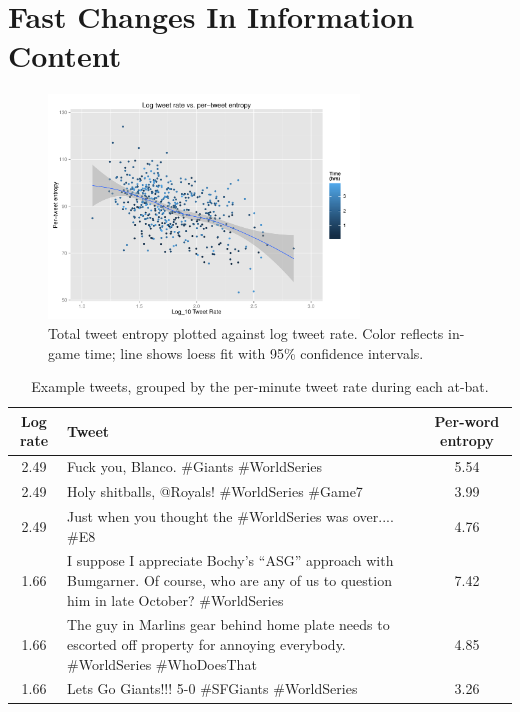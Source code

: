 \documentclass[11pt,letterpaper]{article}
\begin{document}
\section{Fast Changes In Information Content}

\begin{figure}
 \centering
  \includegraphics[width=3.25in]{figures/final-lrate-tent-agg}
 \caption{Total tweet entropy plotted against log tweet rate. Color reflects in-game time; line shows loess fit with 95\% confidence intervals.}\label{fig:time-perword-ent}\vspace*{-.5em}
\end{figure}

\begin{table}
  \begin{tabular}{clc}
Log rate & Tweet & Per-word entropy \\
\hline
2.49 & Fuck you, Blanco. \#Giants \#WorldSeries & 5.54\\
2.49 & Holy shitballs, @Royals! \#WorldSeries \#Game7 & 3.99\\
2.49 & Just when you thought the \#WorldSeries was over.... \#E8 & 4.76\\
\hline
1.66 & \parbox[][6ex][c]{.7\textwidth}{I suppose I appreciate Bochy's ``ASG'' approach with Bumgarner. Of course, who are any of us to question him in late October? \#WorldSeries} & 7.42\\[3pt]
1.66 & \parbox[][6ex][c]{.7\textwidth}{The guy in Marlins gear behind home plate needs to escorted off property for annoying everybody. \#WorldSeries \#WhoDoesThat} & 4.85\\[3pt]
1.66 & Lets Go Giants!!! 5-0  \#SFGiants \#WorldSeries & 3.26\\
\hline
  \end{tabular}
 \caption{Example tweets, grouped by the per-minute tweet rate during each at-bat.}\label{tab:ex2}
\end{table}
\end{document}
